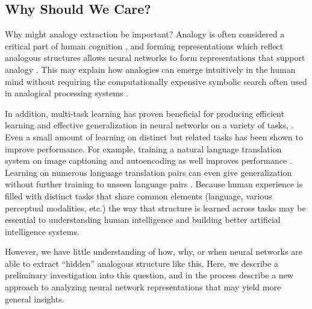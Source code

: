 \documentclass[10pt,letterpaper]{article}
\begin{document}
\subsection{Why Should We Care?}
Why might analogy extraction be important? Analogy is often considered a critical part of human cognition \cite[e.g.]{Gentner2003}, and forming representations which reflect analogous structures allows neural networks to form representations that support analogy \citep{Pennington2014,Kollias2013}. This may explain how analogies can emerge intuitively in the human mind without requiring the computationally expensive symbolic search often used in analogical processing systems \cite[e.g.]{Falkenhainer1989}. \par
In addition, multi-task learning has proven beneficial for producing efficient learning and effective generalization in neural networks on a variety of tasks, \cite[e.g.]{Dong2015,Rusu2015}. Even a small amount of learning on distinct but related tasks has been shown to improve performance. For example, training a natural language translation system on image captioning and autoencoding as well improves performance \citep{Luong2016}. Learning on numerous language translation pairs can even give generalization without further training to unseen language pairs \citep{Johnson2016a}. Because human experience is filled with distinct tasks that share common elements (language, various perceptual modalities, etc.) the way that structure is learned across tasks may be essential to understanding human intelligence and building better artificial intelligence systems.\par
However, we have little understanding of how, why, or when neural networks are able to extract ``hidden'' analogous structure like this. Here, we describe a preliminary investigation into this question, and in the process describe a new approach to analyzing neural network representations that may yield more general insights. 
\end{document}
